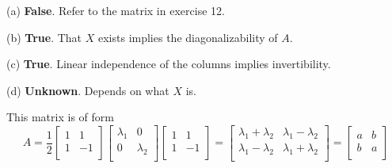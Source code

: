 \documentclass[a4paper]{article}
\begin{document}
(a) \textbf{False}. Refer to the matrix in exercise 12.

(b) \textbf{True}. That \(X\) exists implies the diagonalizability of \(A\).

(c) \textbf{True}. Linear independence of the columns implies invertibility.

(d) \textbf{Unknown}. Depends on what \(X\) is.

\vspace{12pt}


This matrix is of form
\[
	A = \frac{1}{2}
	\begin{bmatrix}
		1 & 1 \\
		1 & -1 \\
	\end{bmatrix}
	\begin{bmatrix}
		\lambda_{1} & 0 \\
		0 & \lambda_{2} \\
	\end{bmatrix}
	\begin{bmatrix}
		1 & 1 \\
		1 & -1 \\
	\end{bmatrix}
	=
	\begin{bmatrix}
		\lambda_{1} + \lambda_{2} & \lambda_{1} - \lambda_{2} \\
		\lambda_{1} - \lambda_{2} & \lambda_{1} + \lambda_{2} \\
	\end{bmatrix} =
	\begin{bmatrix}
		a & b \\
		b & a \\
	\end{bmatrix}
\]

\end{document}
